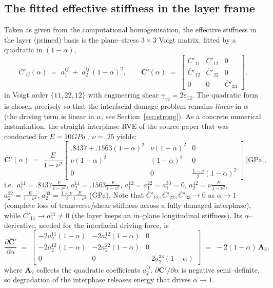 \documentclass[12pt,a4paper]{article}
\newcommand{\Cp}{\overline{\mathbf{C}}'}             %
\begin{document}
	\subsection{The fitted effective stiffness in the layer frame}

	Taken as given from the computational homogenisation, the effective stiffness in
	the layer (primed) basis is the plane--stress $3\times3$ Voigt matrix, fitted by
	a quadratic in $(1-\alpha)$,
	\begin{equation}\label{eq:Cpfit}
		\overline{C}'_{ij}(\alpha) \;=\; a_1^{ij} \;+\; a_2^{ij}\,(1-\alpha)^2,
		\qquad
		\Cp(\alpha) \;=\;
		\begin{bmatrix}
			\overline{C}'_{11} & \overline{C}'_{12} & 0\\[2pt]
			\overline{C}'_{12} & \overline{C}'_{22} & 0\\[2pt]
			0 & 0 & \overline{C}'_{33}
		\end{bmatrix},
	\end{equation}
	in Voigt order $\{11,22,12\}$ with engineering shear $\gamma_{12}=2\varepsilon_{12}$.
	The quadratic form is chosen precisely so that the interfacial damage problem
	remains \emph{linear} in $\alpha$ (the driving term is linear in $\alpha$, see
	Section~\ref{sec:strong}). As a concrete numerical instantiation, the straight
	interphase RVE of the source paper that was conducted for $E=10GPa\ ,\ \nu=.25$ yields:
	\begin{equation}\label{eq:Cp78}
		\Cp(\alpha) \;=\;\frac{E}{1-\nu^2}
		\begin{bmatrix}
			.8437 + .1563(1-\alpha)^2 & \nu(1-\alpha)^2 & 0\\[2pt]
			\nu(1-\alpha)^2 & (1-\alpha)^2 & 0\\[2pt]
			0 & 0 & \frac{1-\nu}{2}(1-\alpha)^2
		\end{bmatrix}\ \text{[GPa]},
	\end{equation}
	i.e.\ $a_1^{11}=.8437\frac{E}{1-\nu^2}$, $a_2^{11}=.1563\frac{E}{1-\nu^2}$, $a_1^{12}=a_1^{22}=a_1^{33}=0$,
	$a_2^{12}=\nu\frac{E}{1-\nu^2}$, $a_2^{22}=\frac{E}{1-\nu^2}$, $a_2^{33}=\frac{1-\nu}{2}\frac{E}{1-\nu^2}$ (GPa). Note that
	$\overline{C}'_{12},\overline{C}'_{22},\overline{C}'_{33}\to0$ as $\alpha\to1$
	(complete loss of transverse/shear stiffness across a fully damaged interphase),
	while $\overline{C}'_{11}\to a_1^{11}\neq0$ (the layer keeps an in--plane
	longitudinal stiffness). Its $\alpha$--derivative, needed for the interfacial
	driving force, is
	\begin{equation}\label{eq:dCp}
		\frac{\partial\Cp}{\partial\alpha} \;=\;
		\begin{bmatrix}
			-2a_2^{11}(1-\alpha) & -2a_2^{12}(1-\alpha) & 0\\[2pt]
			-2a_2^{12}(1-\alpha) & -2a_2^{22}(1-\alpha) & 0\\[2pt]
			0 & 0 & -2a_2^{33}(1-\alpha)
		\end{bmatrix}
		\;=\; -2(1-\alpha)\,\mathbf{A}_2,
	\end{equation}
	where $\mathbf{A}_2$ collects the quadratic coefficients $a_2^{ij}$.
	$\partial\Cp/\partial\alpha$ is negative semi--definite, so degradation of the
	interphase releases energy that drives $\alpha\to1$.
\end{document}
